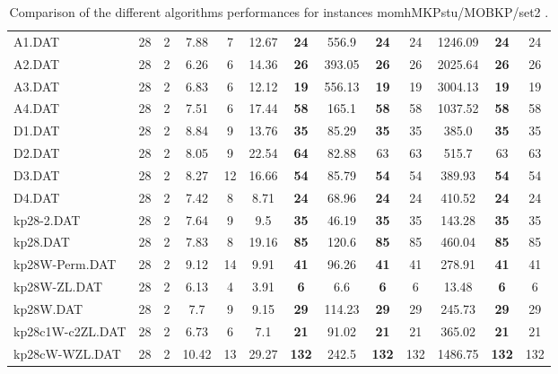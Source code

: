\begin{table}[h]
{\begin{tabular}{lcccccccccccc}
A1.DAT & 28 & 2 &  \textcolor{blue2}{7.88} & 7 & 12.67 &  \textbf{24} & 556.9 &  \textbf{24} & 24 & 1246.09 &  \textbf{24} & 24 \\
A2.DAT & 28 & 2 &  \textcolor{blue2}{6.26} & 6 & 14.36 &  \textbf{26} & 393.05 &  \textbf{26} & 26 & 2025.64 &  \textbf{26} & 26 \\
A3.DAT & 28 & 2 &  \textcolor{blue2}{6.83} & 6 & 12.12 &  \textbf{19} & 556.13 &  \textbf{19} & 19 & 3004.13 &  \textbf{19} & 19 \\
A4.DAT & 28 & 2 &  \textcolor{blue2}{7.51} & 6 & 17.44 &  \textbf{58} & 165.1 &  \textbf{58} & 58 & 1037.52 &  \textbf{58} & 58 \\
D1.DAT & 28 & 2 &  \textcolor{blue2}{8.84} & 9 & 13.76 &  \textbf{35} & 85.29 &  \textbf{35} & 35 & 385.0 &  \textbf{35} & 35 \\
D2.DAT & 28 & 2 &  \textcolor{blue2}{8.05} & 9 & 22.54 &  \textbf{64} & 82.88 & 63 & 63 & 515.7 & 63 & 63 \\
D3.DAT & 28 & 2 &  \textcolor{blue2}{8.27} & 12 & 16.66 &  \textbf{54} & 85.79 &  \textbf{54} & 54 & 389.93 &  \textbf{54} & 54 \\
D4.DAT & 28 & 2 &  \textcolor{blue2}{7.42} & 8 & 8.71 &  \textbf{24} & 68.96 &  \textbf{24} & 24 & 410.52 &  \textbf{24} & 24 \\
kp28-2.DAT & 28 & 2 &  \textcolor{blue2}{7.64} & 9 & 9.5 &  \textbf{35} & 46.19 &  \textbf{35} & 35 & 143.28 &  \textbf{35} & 35 \\
kp28.DAT & 28 & 2 &  \textcolor{blue2}{7.83} & 8 & 19.16 &  \textbf{85} & 120.6 &  \textbf{85} & 85 & 460.04 &  \textbf{85} & 85 \\
kp28W-Perm.DAT & 28 & 2 &  \textcolor{blue2}{9.12} & 14 & 9.91 &  \textbf{41} & 96.26 &  \textbf{41} & 41 & 278.91 &  \textbf{41} & 41 \\
kp28W-ZL.DAT & 28 & 2 & 6.13 & 4 &  \textcolor{blue2}{3.91} &  \textbf{6} & 6.6 &  \textbf{6} & 6 & 13.48 &  \textbf{6} & 6 \\
kp28W.DAT & 28 & 2 &  \textcolor{blue2}{7.7} & 9 & 9.15 &  \textbf{29} & 114.23 &  \textbf{29} & 29 & 245.73 &  \textbf{29} & 29 \\
kp28c1W-c2ZL.DAT & 28 & 2 &  \textcolor{blue2}{6.73} & 6 & 7.1 &  \textbf{21} & 91.02 &  \textbf{21} & 21 & 365.02 &  \textbf{21} & 21 \\
kp28cW-WZL.DAT & 28 & 2 &  \textcolor{blue2}{10.42} & 13 & 29.27 &  \textbf{132} & 242.5 &  \textbf{132} & 132 & 1486.75 &  \textbf{132} & 132 \\
\bottomrule
\end{tabular}
}%
\caption{Comparison of the different algorithms performances for instances momhMKPstu/MOBKP/set2 .}
\label{tab:table_compare_momhMKPstu/MOBKP/set2 }
\end{table}
